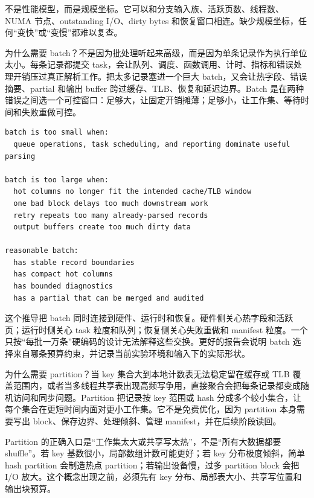  不是性能模型，而是规模坐标。它可以和分支输入族、活跃页数、线程数、NUMA 节点、outstanding I/O、dirty bytes 和恢复窗口相连。缺少规模坐标，任何“变快”或“变慢”都难以复查。

为什么需要 batch？不是因为批处理听起来高级，而是因为单条记录作为执行单位太小。每条记录都提交 task，会让队列、调度、函数调用、计时、指标和错误处理开销压过真正解析工作。把太多记录塞进一个巨大 batch，又会让热字段、错误摘要、partial 和输出 buffer 跨过缓存、TLB、恢复和延迟边界。Batch 是在两种错误之间选一个可控窗口：足够大，让固定开销摊薄；足够小，让工作集、等待时间和失败重做可控。

\begin{lstlisting}[numbers=none,caption={batch 大小的推导口径}]
batch is too small when:
  queue operations, task scheduling, and reporting dominate useful parsing

batch is too large when:
  hot columns no longer fit the intended cache/TLB window
  one bad block delays too much downstream work
  retry repeats too many already-parsed records
  output buffers create too much dirty data

reasonable batch:
  has stable record boundaries
  has compact hot columns
  has bounded diagnostics
  has a partial that can be merged and audited
\end{lstlisting}

这个推导把 batch 同时连接到硬件、运行时和恢复。硬件侧关心热字段和活跃页；运行时侧关心 task 粒度和队列；恢复侧关心失败重做和 manifest 粒度。一个只按“每批一万条”硬编码的设计无法解释这些交换。更好的报告会说明 batch 选择来自哪条预算约束，并记录当前实验环境和输入下的实际形状。

为什么需要 partition？当 key 集合大到本地计数表无法稳定留在缓存或 TLB 覆盖范围内，或者当多线程共享表出现高频写争用，直接聚合会把每条记录都变成随机访问和同步问题。Partition 把记录按 key 范围或 hash 分成多个较小集合，让每个集合在更短时间内面对更小工作集。它不是免费优化，因为 partition 本身需要写出 block、保存边界、处理倾斜、管理 manifest，并在后续阶段读回。

Partition 的正确入口是“工作集太大或共享写太热”，不是“所有大数据都要 shuffle”。若 key 基数很小，局部数组计数可能更好；若 key 分布极度倾斜，简单 hash partition 会制造热点 partition；若输出设备慢，过多 partition block 会把 I/O 放大。这个概念出现之前，必须先有 key 分布、局部表大小、共享写位置和输出块预算。

